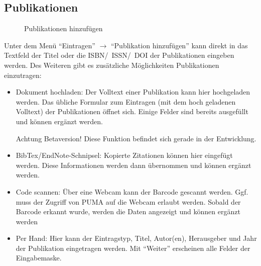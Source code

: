 \subsection{Publikationen}
\begin{figure}[htb]
 \centering
 \caption{Publikationen hinzufügen}
 \label{fig:publikationenHinzufügen}
\end{figure}  
Unter dem Menü \enquote{Eintragen} $\to$ \enquote{Publikation hinzufügen} kann direkt in das Textfeld der Titel oder die ISBN/~ISSN/~DOI der Publikationen eingeben werden. Des Weiteren gibt es zusätzliche Möglichkeiten Publikationen einzutragen:
    \begin{itemize}
    	\item Dokument hochladen:\newline
        Der Volltext einer Publikation kann hier hochgeladen werden. Das übliche Formular zum Eintragen (mit dem hoch geladenen Volltext) der Publikationen öffnet sich. Einige Felder sind bereits ausgefüllt und können ergänzt werden.
				\begin{tip}
Achtung Betaversion! Diese Funktion befindet sich gerade in der Entwicklung.
\end{tip}
			\item BibTex/EndNote-Schnipsel:\newline
			Kopierte Zitationen können hier eingefügt werden. Diese Informationen werden dann übernommen und können ergänzt werden.
        \item Code scannen: \newline
Über eine Webcam kann der Barcode gescannt werden. Ggf. muss der Zugriff von PUMA auf die Webcam erlaubt werden. Sobald der Barcode erkannt wurde, werden die Daten angezeigt und können ergänzt werden
        \item Per Hand:
				Hier kann der Eintragstyp, Titel, Autor(en), Herausgeber und Jahr der Publikation eingetragen werden. Mit \enquote{Weiter} erscheinen alle Felder der Eingabemaske. 
    \end{itemize}

